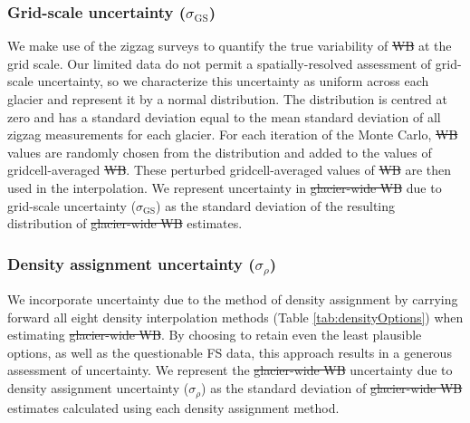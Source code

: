 \documentclass[review,oneside, letterpaper]{igs} %
\providecommand{\DIFadd}[1]{{\protect\color{blue}\uwave{#1}}} %
\providecommand{\DIFdel}[1]{{\protect\color{red}\sout{#1}}}                      %
\providecommand{\DIFaddbegin}{} %
\providecommand{\DIFaddend}{} %
\providecommand{\DIFdelbegin}{} %
\providecommand{\DIFdelend}{} %
\newcommand{\DIFscaledelfig}{0.5}
\newlength{\DIFdelgraphicswidth} %
\newlength{\DIFdelgraphicsheight} %
\newcommand{\DIFaddincludegraphics}[2][]{{\color{blue}\fbox{\DIFOincludegraphics[#1]{#2}}}} %
\newcommand{\DIFdelincludegraphics}[2][]{%
\sbox{\DIFdelgraphicsbox}{\DIFOincludegraphics[#1]{#2}}%
\settoboxwidth{\DIFdelgraphicswidth}{\DIFdelgraphicsbox} %
\settoboxtotalheight{\DIFdelgraphicsheight}{\DIFdelgraphicsbox} %
\scalebox{\DIFscaledelfig}{%
\parbox[b]{\DIFdelgraphicswidth}{\usebox{\DIFdelgraphicsbox}\\[-\baselineskip] \rule{\DIFdelgraphicswidth}{0em}}\llap{\resizebox{\DIFdelgraphicswidth}{\DIFdelgraphicsheight}{%
\setlength{\unitlength}{\DIFdelgraphicswidth}%
\begin{picture}(1,1)%
\thicklines\linethickness{2pt} %
{\color[rgb]{1,0,0}\put(0,0){\framebox(1,1){}}}%
{\color[rgb]{1,0,0}\put(0,0){\line( 1,1){1}}}%
{\color[rgb]{1,0,0}\put(0,1){\line(1,-1){1}}}%
\end{picture}%
}\hspace*{3pt}}} %
} %
\DeclareRobustCommand{\DIFaddbegin}{\DIFOaddbegin \let\includegraphics\DIFaddincludegraphics} %
\DeclareRobustCommand{\DIFaddend}{\DIFOaddend \let\includegraphics\DIFOincludegraphics} %
\DeclareRobustCommand{\DIFdelbegin}{\DIFOdelbegin \let\includegraphics\DIFdelincludegraphics} %
\DeclareRobustCommand{\DIFdelend}{\DIFOaddend \let\includegraphics\DIFOincludegraphics} %
\begin{document}
	\subsubsection{Grid-scale uncertainty ($\sigma_{\mathrm{GS}}$)}
We make use of the zigzag surveys to quantify the true variability of \DIFdelbegin \DIFdel{WB }\DIFdelend \DIFaddbegin \DIFadd{$b_\mathrm{w}$ }\DIFaddend at the grid scale. Our limited data do not permit a spatially-resolved assessment of grid-scale uncertainty, so we characterize this uncertainty as uniform across each glacier and represent it by a normal distribution. The distribution is centred at zero and has a standard deviation equal to the mean standard deviation of all zigzag measurements for each glacier. For each iteration of the Monte Carlo, \DIFdelbegin \DIFdel{WB }\DIFdelend \DIFaddbegin \DIFadd{$b_\mathrm{w}$ }\DIFaddend values are randomly chosen from the distribution and added to the values of gridcell-averaged \DIFdelbegin \DIFdel{WB}\DIFdelend \DIFaddbegin \DIFadd{$b_\mathrm{w}$}\DIFaddend . These perturbed gridcell-averaged values of \DIFdelbegin \DIFdel{WB }\DIFdelend \DIFaddbegin \DIFadd{$b_\mathrm{w}$ }\DIFaddend are then used in the interpolation. We represent uncertainty in \DIFdelbegin \DIFdel{glacier-wide WB }\DIFdelend \DIFaddbegin \DIFadd{$B_\mathrm{w}$ }\DIFaddend due to grid-scale uncertainty ($\sigma_{\mathrm{GS}}$) as the standard deviation of the resulting distribution of \DIFdelbegin \DIFdel{glacier-wide WB }\DIFdelend \DIFaddbegin \DIFadd{$B_\mathrm{w}$ }\DIFaddend estimates.  

	\subsubsection{Density assignment uncertainty ($\sigma_{\rho}$)}
We incorporate uncertainty due to the method of density assignment by carrying forward all eight density interpolation methods (Table \ref{tab:densityOptions}) when estimating \DIFdelbegin \DIFdel{glacier-wide WB}\DIFdelend \DIFaddbegin \DIFadd{$B_\mathrm{w}$}\DIFaddend . By choosing to retain even the least plausible options, as well as the questionable FS data, this approach results in a generous assessment of uncertainty. We represent the \DIFdelbegin \DIFdel{glacier-wide WB }\DIFdelend \DIFaddbegin \DIFadd{$B_\mathrm{w}$ }\DIFaddend uncertainty due to density assignment uncertainty ($\sigma_{\rho}$) as the standard deviation of \DIFdelbegin \DIFdel{glacier-wide WB }\DIFdelend \DIFaddbegin \DIFadd{$B_\mathrm{w}$ }\DIFaddend estimates calculated using each density assignment method.
\end{document}
